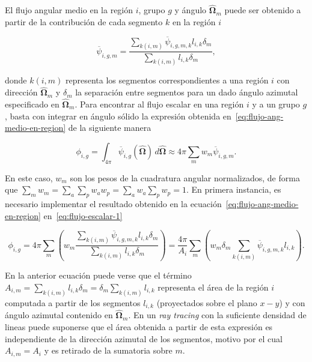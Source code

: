 \documentclass[11pt]{article}
\numberwithin{equation}{section}
\begin{document}
El flujo angular medio en la región $i$, grupo $g$ y ángulo $\boldsymbol{\hat{\Omega}}_m$ puede ser obtenido a partir de la contribuci\'on de cada segmento $k$ en la región $i$

\begin{equation} \label{eq:flujo-ang-medio-en-region}
 \overline{\psi}_{i,g,m} = \frac{\sum_{k(i,m)} \overline{\psi}_{i,g,m,k} l_{i,k} \delta_m}{\sum_{k(i,m)} l_{i,k} \delta_m},
\end{equation}

\noindent
donde $k(i,m)$ representa los segmentos correspondientes a una región $i$ con dirección $\boldsymbol{\hat{\Omega}}_m$ y $\delta_m$ la separaci\'on entre segmentos para un dado ángulo azimutal especificado en $\boldsymbol{\hat{\Omega}}_m$. Para encontrar al flujo escalar en una región $i$ y a un grupo $g$, basta con integrar en ángulo s\'olido la expresi\'on obtenida en~\eqref{eq:flujo-ang-medio-en-region} de la siguiente manera

\begin{equation} \label{eq:flujo-escalar-1}
 \phi_{i,g} = \int_{4\pi} \overline{\psi}_{i,g} (\boldsymbol{\hat{\Omega}}) \, d\boldsymbol{\hat{\Omega}} \approx 
 4\pi \sum_m w_m \overline{\psi}_{i,g,m}.
\end{equation}

\noindent
En este caso, $w_m$ son los pesos de la cuadratura angular normalizados, de forma que $\sum_m w_m = \sum_a \sum_p w_a w_p = \sum_a w_a \sum_p w_p = 1$. En primera instancia, es necesario implementar el resultado obtenido en la ecuación~\eqref{eq:flujo-ang-medio-en-region} en~\eqref{eq:flujo-escalar-1}

\begin{equation} \label{eq:flujo-escalar-2}
 \phi_{i,g} =
 4\pi \sum_m \left( w_m \frac{\sum_{k(i,m)} \overline{\psi}_{i,g,m,k} l_{i,k} \delta_m}{\sum_{k(i,m)} l_{i,k} \delta_m} \right) = 
 \frac{4\pi}{A_i} \sum_m \left( w_m \delta_m \sum_{k(i,m)} \overline{\psi}_{i,g,m,k} l_{i,k} \right).
\end{equation}

\noindent
En la anterior ecuación puede verse que el t\'ermino $A_{i,m} = \sum_{k(i,m)} l_{i,k} \delta_m = \delta_m \sum_{k(i,m)} l_{i,k}$ representa el área de la región $i$ computada a partir de los segmentos $l_{i,k}$ (proyectados sobre el plano $x - y$) y con ángulo azimutal contenido en $\boldsymbol{\hat{\Omega}}_m$. En un \emph{ray tracing} con la suficiente densidad de lineas puede suponerse que el área obtenida a partir de esta expresi\'on es independiente de la dirección azimutal de los segmentos, motivo por el cual $A_{i,m} = A_i$ y es retirado de la sumatoria sobre $m$.
\end{document}
